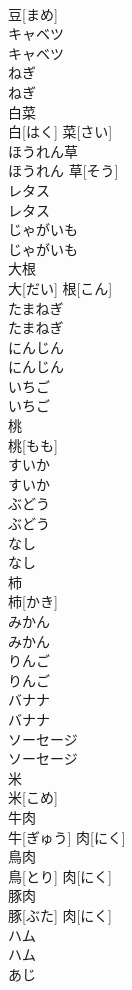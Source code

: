 \documentclass[8pt]{extreport}
\begin{document}
\begin{CJK}{UTF8}{min}
\\	豆[まめ]		
\\	キャベツ	
\\	キャベツ		
\\	ねぎ	
\\	ねぎ		
\\	白菜	
\\	白[はく] 菜[さい]		
\\	ほうれん草	
\\	ほうれん 草[そう]		
\\	レタス	
\\	レタス		
\\	じゃがいも	
\\	じゃがいも		
\\	大根	
\\	大[だい] 根[こん]		
\\	たまねぎ	
\\	たまねぎ		
\\	にんじん	
\\	にんじん		
\\	いちご	
\\	いちご		
\\	桃	
\\	桃[もも]		
\\	すいか	
\\	すいか		
\\	ぶどう	
\\	ぶどう		
\\	なし	
\\	なし		
\\	柿	
\\	柿[かき]		
\\	みかん	
\\	みかん		
\\	りんご	
\\	りんご		
\\	バナナ	
\\	バナナ		
\\	ソーセージ	
\\	ソーセージ		
\\	米	
\\	米[こめ]		
\\	牛肉	
\\	牛[ぎゅう] 肉[にく]		
\\	鳥肉	
\\	鳥[とり] 肉[にく]		
\\	豚肉	
\\	豚[ぶた] 肉[にく]		
\\	ハム	
\\	ハム		
\\	あじ	

\end{CJK}
\end{document}
